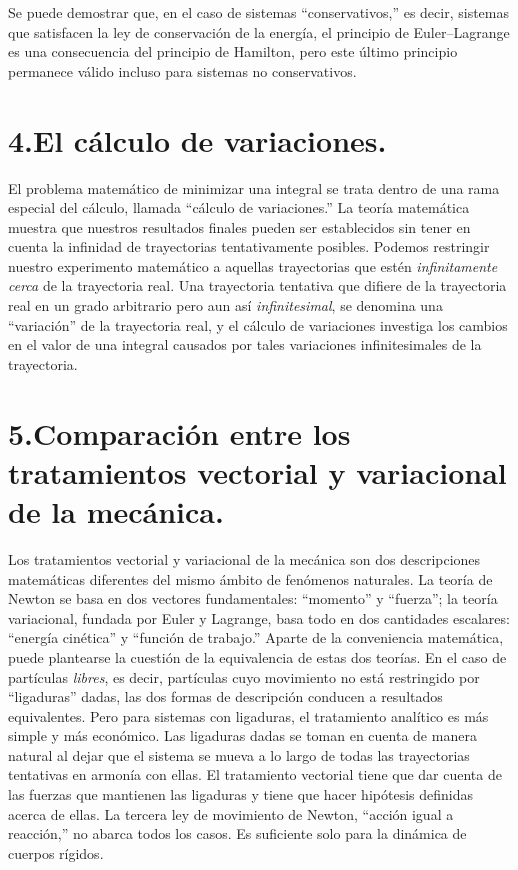 Se puede demostrar que, en el caso de sistemas ``conservativos,'' es decir, sistemas que satisfacen la ley de conservación de la energía, el principio de Euler--Lagrange es una consecuencia del principio de Hamilton, pero este último principio permanece válido incluso para sistemas no conservativos.

\section*{4.\quad El cálculo de variaciones.}

El problema matemático de minimizar una integral se trata dentro de una rama especial del cálculo, llamada ``cálculo de variaciones.'' La teoría matemática muestra que nuestros resultados finales pueden ser establecidos sin tener en cuenta la infinidad de trayectorias tentativamente posibles. Podemos restringir nuestro experimento matemático a aquellas trayectorias que estén \textit{infinitamente cerca} de la trayectoria real. Una trayectoria tentativa que difiere de la trayectoria real en un grado arbitrario pero aun así \textit{infinitesimal}, se denomina una ``variación'' de la trayectoria real, y el cálculo de variaciones investiga los cambios en el valor de una integral causados por tales variaciones infinitesimales de la trayectoria.

\section*{5.\quad Comparación entre los tratamientos vectorial y variacional de la mecánica.}

Los tratamientos vectorial y variacional de la mecánica son dos descripciones matemáticas diferentes del mismo ámbito de fenómenos naturales. La teoría de Newton se basa en dos vectores fundamentales: ``momento'' y ``fuerza''; la teoría variacional, fundada por Euler y Lagrange, basa todo en dos cantidades escalares: ``energía cinética'' y ``función de trabajo.'' Aparte de la conveniencia matemática, puede plantearse la cuestión de la equivalencia de estas dos teorías. En el caso de partículas \textit{libres}, es decir, partículas cuyo movimiento no está restringido por ``ligaduras'' dadas, las dos formas de descripción conducen a resultados equivalentes. Pero para sistemas con ligaduras, el tratamiento analítico es más simple y más económico. Las ligaduras dadas se toman en cuenta de manera natural al dejar que el sistema se mueva a lo largo de todas las trayectorias tentativas en armonía con ellas. El tratamiento vectorial tiene que dar cuenta de las fuerzas que mantienen las ligaduras y tiene que hacer hipótesis definidas acerca de ellas. La tercera ley de movimiento de Newton, ``acción igual a reacción,'' no abarca todos los casos. Es suficiente solo para la dinámica de cuerpos rígidos.

